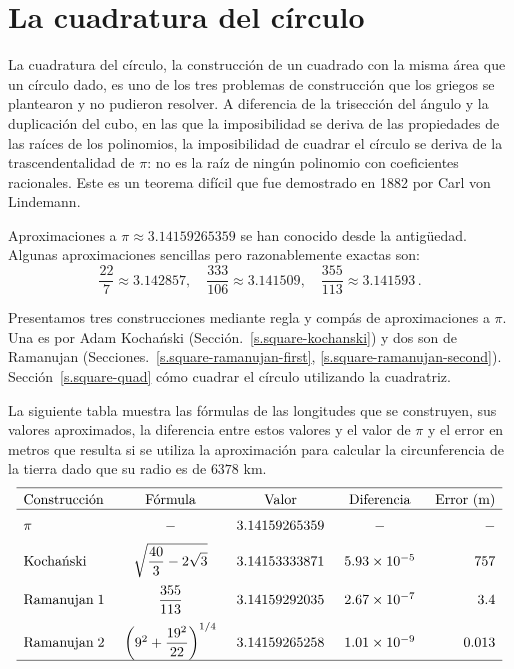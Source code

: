 
\chapter{La cuadratura del círculo}\label{c.square}


La cuadratura del círculo, la construcción de un cuadrado con la misma área que un círculo dado, es uno de los tres problemas de construcción que los griegos se plantearon y no pudieron resolver. A diferencia de la trisección del ángulo y la duplicación del cubo, en las que la imposibilidad se deriva de las propiedades de las raíces de los polinomios, la imposibilidad de cuadrar el círculo se deriva de la trascendentalidad de $\pi$: no es la raíz de ningún polinomio con coeficientes racionales. Este es un teorema difícil que fue demostrado en 1882 por Carl von Lindemann.

Aproximaciones a $\pi\approx 3.14159265359$ se han conocido desde la antigüedad. Algunas aproximaciones sencillas pero razonablemente exactas son:
\[
\displaystyle\frac{22}{7}\approx 3.142857,\quad \displaystyle\frac{333}{106}\approx 3.141509,\quad \displaystyle\frac{355}{113}\approx 3.141593\,.
\]

Presentamos tres construcciones mediante regla y compás de aproximaciones a $\pi$. Una es por Adam Kocha\'{n}ski (Sección.~\ref{s.square-kochanski}) y dos son de Ramanujan (Secciones.~\ref{s.square-ramanujan-first}, \ref{s.square-ramanujan-second}). Sección~\ref{s.square-quad} cómo cuadrar el círculo utilizando la cuadratriz.

La siguiente tabla muestra las fórmulas de las longitudes que se construyen, sus valores aproximados, la diferencia entre estos valores y el valor de $\pi$ y el error en metros que resulta si se utiliza la aproximación para calcular la circunferencia de la tierra dado que su radio es de $6378$ km.
\[
\begin{array}{l@{\hspace{5mm}}c@{\hspace{5mm}}c@{\hspace{5mm}}c@{\hspace{5mm}}r}
\hline\noalign{\smallskip}
\textrm{Construcción} & \textrm{Fórmula} &\textrm{Valor} & \textrm{Diferencia} & \textrm{Error (m)}\\\hline\noalign{\medskip}
\pi & -& 3.14159265359 & - & -\\\noalign{\medskip}
\textrm{Kocha\'{n}ski} & \sqrt{\displaystyle\frac{40}{3}-2\sqrt{3}}&
  3.14153333871 & 5.93 \times 10^{-5} & 757\\\noalign{\medskip}
\textrm{Ramanujan}\; 1 & \displaystyle\frac{355}{113} &
  3.14159292035 &2.67  \times 10^{-7}&3.4\\\noalign{\medskip}
\textrm{Ramanujan}\; 2 &\left(9^2+\displaystyle\frac{19^2}{22}\right)^{1/4}&
  3.14159265258 & 1.01 \times 10^{-9}& 0.013\\
\hline\noalign{\smallskip}
\end{array}
\]

